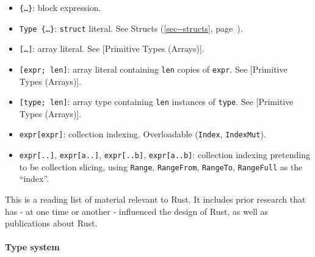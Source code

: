 \documentclass[a4paper,]{book}
\renewcommand*{\hyperref}[2][\ar]{%
  \def\ar{#2}%
  #2 (\autoref{#1}, page~\pageref{#1})}
\let\oldparagraph\paragraph
\renewcommand{\paragraph}[1]{\oldparagraph{#1}\mbox{}}
\begin{document}
\begin{itemize}
\itemsep1pt\parskip0pt
\item
  \texttt{\{\ldots{}\}}: block expression.
\item
  \texttt{Type\ \{\ldots{}\}}: \texttt{struct} literal. See
  \hyperref[sec--structs]{Structs}.
\end{itemize}

\begin{itemize}
\itemsep1pt\parskip0pt
\item
  \texttt{{[}\ldots{}{]}}: array literal. See {[}Primitive Types
  (Arrays){]}.
\item
  \texttt{{[}expr;\ len{]}}: array literal containing \texttt{len}
  copies of \texttt{expr}. See {[}Primitive Types (Arrays){]}.
\item
  \texttt{{[}type;\ len{]}}: array type containing \texttt{len}
  instances of \texttt{type}. See {[}Primitive Types (Arrays){]}.
\item
  \texttt{expr{[}expr{]}}: collection indexing. Overloadable
  (\texttt{Index}, \texttt{IndexMut}).
\item
  \texttt{expr{[}..{]}}, \texttt{expr{[}a..{]}}, \texttt{expr{[}..b{]}},
  \texttt{expr{[}a..b{]}}: collection indexing pretending to be
  collection slicing, using \texttt{Range}, \texttt{RangeFrom},
  \texttt{RangeTo}, \texttt{RangeFull} as the ``index''.
\end{itemize}


This is a reading list of material relevant to Rust. It includes prior
research that has - at one time or another - influenced the design of
Rust, as well as publications about Rust.

\paragraph{Type system}\label{type-system}
\end{document}

